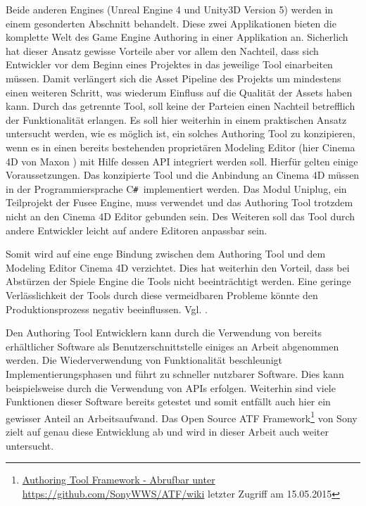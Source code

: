 \documentclass[pagesize, paper=a4, fontsize=12pt, titlepage=true, headings=small, headnosepline, abstractoff, liststotoc, nochapterprefix, plainheadsepline, twoside]{scrreprt}
\newcommand{\CSS}{C\texttt{\# }}
\begin{document}
Beide anderen Engines (Unreal Engine 4 und Unity3D Version 5) werden in einem gesonderten Abschnitt behandelt. Diese zwei Applikationen bieten die komplette Welt des Game Engine Authoring in einer Applikation an. Sicherlich hat dieser Ansatz gewisse Vorteile aber vor allem den Nachteil, dass sich Entwickler vor dem Beginn eines Projektes in das jeweilige Tool einarbeiten müssen. Damit verlängert sich die Asset Pipeline des Projekts um mindestens einen weiteren Schritt, was wiederum Einfluss auf die Qualität der Assets haben kann. Durch das getrennte Tool, soll keine der Parteien einen Nachteil betrefflich der Funktionalität erlangen.
Es soll hier weiterhin in einem praktischen Ansatz untersucht werden, wie es möglich ist, ein solches Authoring Tool zu konzipieren, wenn es in einen bereits bestehenden proprietären Modeling Editor (hier Cinema 4D von Maxon ) mit Hilfe dessen API integriert werden soll. Hierfür gelten einige Voraussetzungen. Das konzipierte Tool und die Anbindung an Cinema 4D müssen in der Programmiersprache \CSS implementiert werden. Das Modul Uniplug, ein Teilprojekt der Fusee Engine, muss verwendet und das Authoring Tool trotzdem nicht an den Cinema 4D Editor gebunden sein. Des Weiteren soll das Tool durch andere Entwickler leicht auf andere Editoren anpassbar sein.

Somit wird auf eine enge Bindung zwischen dem Authoring Tool und dem Modeling Editor Cinema 4D verzichtet. Dies hat weiterhin den Vorteil, dass bei Abstürzen der Spiele Engine die Tools nicht beeinträchtigt werden. Eine geringe Verlässlichkeit der Tools durch diese vermeidbaren Probleme könnte den Produktionsprozess negativ beeinflussen. Vgl. .

Den Authoring Tool Entwicklern kann durch die Verwendung von bereits erhältlicher Software als Benutzerschnittstelle einiges an Arbeit abgenommen werden. Die Wiederverwendung von Funktionalität beschleunigt Implementierungsphasen und führt zu schneller nutzbarer Software. Dies kann beispielsweise durch die Verwendung von APIs erfolgen. Weiterhin sind viele Funktionen dieser Software bereits getestet und somit entfällt auch hier ein gewisser Anteil an Arbeitsaufwand. Das Open Source ATF Framework\footnote{\url{Authoring Tool Framework - Abrufbar unter https://github.com/SonyWWS/ATF/wiki} letzter Zugriff am 15.05.2015} von Sony zielt auf genau diese Entwicklung ab und wird in dieser Arbeit auch weiter untersucht.
\end{document}
